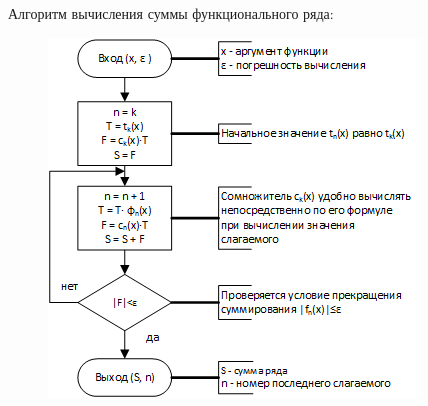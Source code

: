 \documentclass{beamer}
\begin{document}
\begin{frame}
Алгоритм вычисления суммы функционального ряда:
\begin{figure}[h]
\centering
\includegraphics[scale=0.75]{images/lec05-pic05.png}
\end{figure}
\end{frame}

\end{document}
